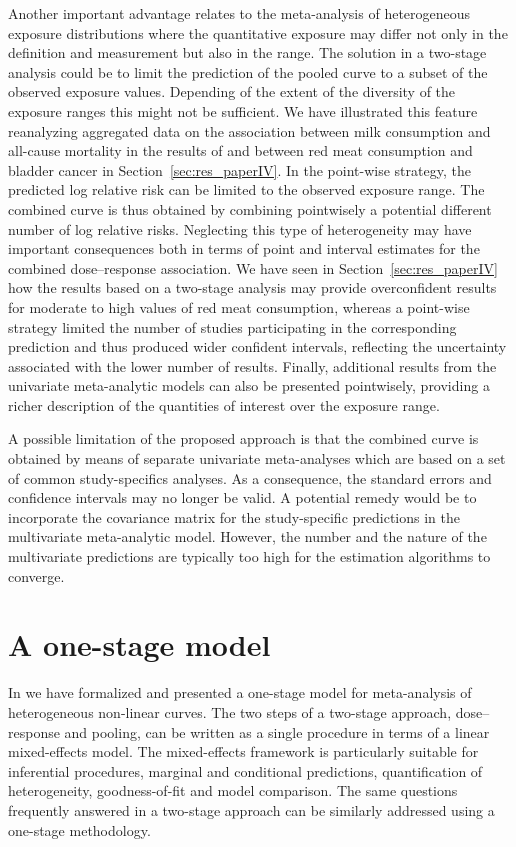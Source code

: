 \documentclass[11pt,a4paper,twoside,openany]{book}\usepackage{knitr}
\begin{document}
{{Another important advantage relates to the meta-analysis of heterogeneous exposure distributions where the quantitative exposure may differ not only in the definition and measurement but also in the range. The solution in a two-stage analysis could be to limit the prediction of the pooled curve to a subset of the observed exposure values. Depending of the extent of the diversity of the exposure ranges this might not be sufficient. We have illustrated this feature reanalyzing aggregated data on the association between milk consumption and all-cause mortality in the results of  and between red meat consumption and bladder cancer in Section~\ref{sec:res_paperIV}. 
In the point-wise strategy, the predicted log relative risk can be limited to the observed exposure range. The combined curve is thus obtained by combining pointwisely a potential different number of log relative risks. Neglecting this type of heterogeneity may have important consequences both in terms of point and interval estimates for the combined dose--response association. We have seen in Section~\ref{sec:res_paperIV} how the results based on a two-stage analysis may provide overconfident results for moderate to high values of red meat consumption, whereas a point-wise strategy limited the number of studies participating in the corresponding prediction and thus produced wider confident intervals, reflecting the uncertainty associated with the lower number of results. Finally, additional results from the univariate meta-analytic models can also be presented pointwisely, providing a richer description of the quantities of interest over the exposure range.

A possible limitation of the proposed approach is that the combined curve is obtained by means of separate univariate meta-analyses which are based on a set of common study-specifics analyses. As a consequence, the standard errors and confidence intervals may no longer be valid. A potential remedy would be to incorporate the covariance matrix for the study-specific predictions in the multivariate meta-analytic model. However, the number and the nature of the multivariate predictions are typically too high for the estimation algorithms to converge.


\section{A one-stage model}

In  we have formalized and presented a one-stage model for meta-analysis of heterogeneous non-linear curves. The two steps of a two-stage approach, dose--response and pooling, can be written as a single procedure in terms of a linear mixed-effects model. The mixed-effects framework is particularly suitable for inferential procedures, marginal and conditional predictions, quantification of heterogeneity, goodness-of-fit and model comparison. The same questions frequently answered in a two-stage approach can be similarly addressed using a one-stage methodology. 

}}
\end{document}
